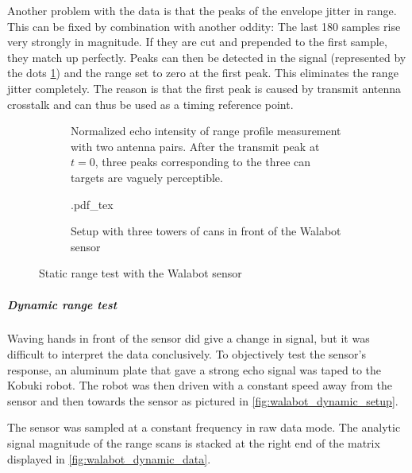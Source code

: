 Another problem with the data is that the peaks of the envelope jitter in range. This can be fixed by combination with another oddity: The last 180 samples rise very strongly in magnitude. If they are cut and prepended to the first sample, they match up perfectly. Peaks can then be detected in the signal (represented by the dots \cref{fig:walabot_rangetest_data}) and the range set to zero at the first peak. This eliminates the range jitter completely. The reason is that the first peak is caused by transmit antenna crosstalk and can thus be used as a timing reference point.

\begin{figure}[htbp]
    \centering
    \begin{subfigure}{.8\textwidth}
        \centering
        \def\svgwidth{\linewidth}
        
        \caption{Normalized echo intensity of range profile measurement with two antenna pairs. After the transmit peak at \(t=0\), three peaks corresponding to the three can targets are vaguely perceptible.}
        \label{fig:walabot_rangetest_data}
    \end{subfigure}
    \begin{subfigure}{.8\textwidth}
        \centering
        \def\svgwidth{\linewidth}
        .pdf_tex
        \caption{Setup with three towers of cans in front of the Walabot sensor}
        \label{fig:walabot_rangetest_setup}
    \end{subfigure}
    \caption{Static range test with the Walabot sensor}
    \label{fig:walabot_rangetest}
\end{figure}

\subparagraph{Dynamic range test}\label{dynamic-range-test}

Waving hands in front of the sensor did give a change in signal, but it
was difficult to interpret the data conclusively. To objectively test
the sensor's response, an aluminum plate that gave a strong echo signal
was taped to the Kobuki robot. The robot was then driven with a constant
speed away from the sensor and then towards the sensor as pictured in
\cref{fig:walabot_dynamic_setup}.

The sensor was sampled at a constant frequency in raw data mode. The
analytic signal magnitude of the range scans is stacked at the right end of the
matrix displayed in \cref{fig:walabot_dynamic_data}.

